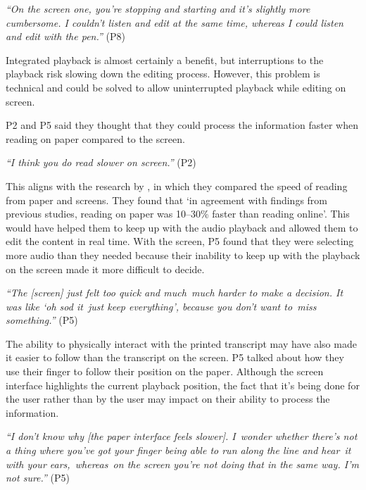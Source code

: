\textit{``On the screen one, you're stopping and starting and it's slightly more cumbersome. I couldn't listen and edit
at the same time, whereas I could listen and edit with the pen.''} (P8)

Integrated playback is almost certainly a benefit, but interruptions to the playback risk slowing down the editing
process. However, this problem is technical and could be solved to allow uninterrupted playback while editing on screen.


P2 and P5 said they thought that they could process the information faster when reading on paper compared to the
screen.

\textit{``I think you do read slower on screen.''} (P2)

This aligns with the research by \cite{Kurniawan2001}, in which they compared the speed of reading from paper and
screens. They found that `in agreement with findings from previous studies, reading on paper was 10--30\% faster than
reading online'.  This would have helped them to keep up with the audio playback and allowed them to edit the content
in real time. With the screen, P5 found that they were selecting more audio than they needed because their inability to
keep up with the playback on the screen made it more difficult to decide.

\textit{``The [screen] just felt too quick and much much harder to make a decision. It was like `oh sod it just keep
everything', because you don't want to miss something.''} (P5)

The ability to physically interact with the printed transcript may have also made it easier to follow than the
transcript on the screen. P5 talked about how they use their finger to follow their position on the paper. Although the
screen interface highlights the current playback position, the fact that it's being done for the user rather than by
the user may impact on their ability to process the information.

\textit{``I don't know why [the paper interface feels slower]. I wonder whether there's not a thing where
you've got your finger being able to run along the line and hear it with your ears, whereas on the screen you're not
doing that in the same way. I'm not sure.''} (P5) 

